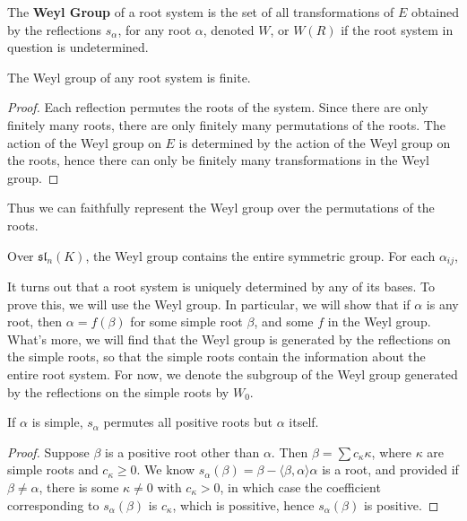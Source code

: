The {\bf Weyl Group} of a root system is the set of all transformations of $E$ obtained by the reflections $s_\alpha$, for any root $\alpha$, denoted $W$, or $W(R)$ if the root system in question is undetermined.

\begin{theorem}
    The Weyl group of any root system is finite.
\end{theorem}
\begin{proof}
    Each reflection permutes the roots of the system. Since there are only finitely many roots, there are only finitely many permutations of the roots. The action of the Weyl group on $E$ is determined by the action of the Weyl group on the roots, hence there can only be finitely many transformations in the Weyl group.
\end{proof}

Thus we can faithfully represent the Weyl group over the permutations of the roots.

\begin{example}
    Over $\mathfrak{sl}_n(K)$, the Weyl group contains the entire symmetric group. For each $\alpha_{ij}$,
\end{example}

It turns out that a root system is uniquely determined by any of its bases. To prove this, we will use the Weyl group. In particular, we will show that if $\alpha$ is any root, then $\alpha = f(\beta)$ for some simple root $\beta$, and some $f$ in the Weyl group. What's more, we will find that the Weyl group is generated by the reflections on the simple roots, so that the simple roots contain the information about the entire root system. For now, we denote the subgroup of the Weyl group generated by the reflections on the simple roots by $W_0$.

\begin{lemma}
    If $\alpha$ is simple, $s_\alpha$ permutes all positive roots but $\alpha$ itself.
\end{lemma}
\begin{proof}
    Suppose $\beta$ is a positive root other than $\alpha$. Then $\beta = \sum c_\kappa \kappa$, where $\kappa$ are simple roots and $c_\kappa \geq 0$. We know $s_\alpha(\beta) = \beta - \langle \beta, \alpha \rangle \alpha$ is a root, and provided if $\beta \neq \alpha$, there is some $\kappa \neq 0$ with $c_\kappa > 0$, in which case the coefficient corresponding to $s_\alpha(\beta)$ is $c_\kappa$, which is possitive, hence $s_\alpha(\beta)$ is positive.
\end{proof}

